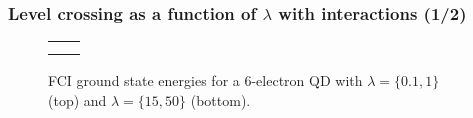 \documentclass[xcolor=pdftex,hyperref={pdfpagelabels=false},table]{beamer}
\begin{document}
\begin{frame}
\frametitle{Level crossing as a function of $\lambda$ with interactions (1/2)}
\begin{scriptsize}
\begin{figure}
	\begin{center}
\begin{tabular}{cc}
	\scalebox{0.25}{} & \scalebox{0.25}{} \\
	\scalebox{0.25}{} & \scalebox{0.25}{} \\
\end{tabular}
	\end{center}
	\vspace{-5pt}
	\caption{FCI ground state energies for a 6-electron QD with $\lambda=\{0.1,1\}$ (top) and $\lambda=\{15,50\}$ (bottom).}
\end{figure}
\end{scriptsize}
\end{frame}
\end{document}
